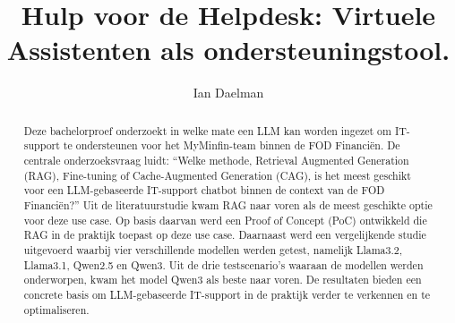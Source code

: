 \documentclass[a0,portrait]{hogent-poster}
\title{Hulp voor de Helpdesk: Virtuele Assistenten als ondersteuningstool.}
\author{Ian Daelman}
\begin{document}
\maketitle

\begin{abstract}
Deze bachelorproef onderzoekt in welke mate een LLM kan worden ingezet om IT-support te ondersteunen voor het MyMinfin-team binnen de FOD Financiën. De centrale onderzoeksvraag luidt: “Welke methode, Retrieval Augmented Generation (RAG), Fine-tuning of Cache-Augmented Generation (CAG), is het meest geschikt voor een LLM-gebaseerde IT-support chatbot binnen de context van de FOD Financiën?” Uit de literatuurstudie kwam RAG naar voren als de meest geschikte optie voor deze use case. Op basis daarvan werd een Proof of Concept (PoC) ontwikkeld die RAG in de praktijk toepast op deze use case. Daarnaast werd een vergelijkende studie uitgevoerd waarbij vier verschillende modellen werden getest, namelijk Llama3.2, Llama3.1, Qwen2.5 en Qwen3. Uit de drie testscenario’s waaraan de modellen werden onderworpen, kwam het model Qwen3 als beste naar voren. De resultaten bieden een concrete basis om LLM-gebaseerde IT-support in de praktijk verder te verkennen en te optimaliseren.
\end{abstract}
\end{document}
